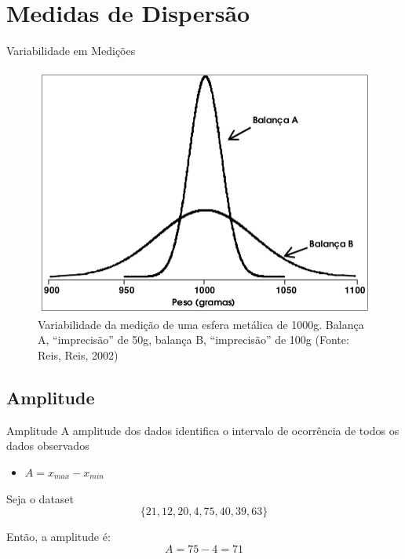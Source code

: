 \documentclass{beamer}
\begin{document}
\section{Medidas de Dispersão}

\begin{frame}{Variabilidade em Medições}
  \begin{figure}
    \includegraphics[height=0.7\textheight]{Desc_II/variancia}
    \caption{Variabilidade da medição de uma esfera metálica de
      1000g. Balança A, ``imprecisão'' de 50g, balança B,
      ``imprecisão'' de 100g (Fonte: Reis, Reis, 2002)}
  \end{figure}
\end{frame}

\subsection{Amplitude}
\begin{frame}{Amplitude}
  A amplitude dos dados identifica o intervalo de ocorrência de todos
  os dados observados
  \begin{itemize}
  \item $A = x_{max} - x_{min}$
  \end{itemize}
  \begin{example}
    Seja o dataset $$\{21, 12, 20, 4, 75, 40, 39, 63 \}$$

    Então, a amplitude é:
      $$A = 75 - 4 = 71$$
  \end{example}
\end{frame}
\end{document}
